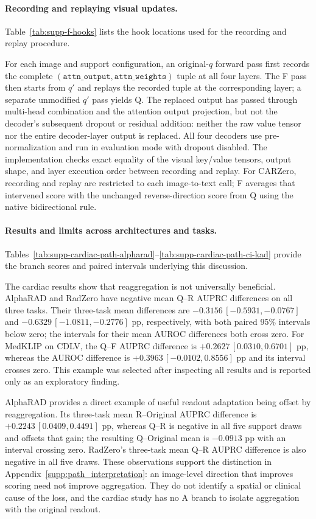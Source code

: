 \paragraph{Recording and replaying visual updates.}
Table~\ref{tab:supp-f-hooks} lists the hook locations used for the recording and replay procedure.

For each image and support configuration, an original-$q$ forward pass first records the complete $(\texttt{attn\_output},\texttt{attn\_weights})$ tuple at all four layers. The F pass then starts from $q'$ and replays the recorded tuple at the corresponding layer; a separate unmodified $q'$ pass yields Q. The replaced output has passed through multi-head combination and the attention output projection, but not the decoder's subsequent dropout or residual addition: neither the raw value tensor nor the entire decoder-layer output is replaced. All four decoders use pre-normalization and run in evaluation mode with dropout disabled. The implementation checks exact equality of the visual key/value tensors, output shape, and layer execution order between recording and replay. For CARZero, recording and replay are restricted to each image-to-text call; F averages that intervened score with the unchanged reverse-direction score from Q using the native bidirectional rule.

\paragraph{Results and limits across architectures and tasks.}
Tables~\ref{tab:supp-cardiac-path-alpharad}--\ref{tab:supp-cardiac-path-ci-kad} provide the branch scores and paired intervals underlying this discussion.

The cardiac results show that reaggregation is not universally beneficial. AlphaRAD and RadZero have negative mean Q--R AUPRC differences on all three tasks. Their three-task mean differences are $-0.3156\,[-0.5931,-0.0767]$ and $-0.6329\,[-1.0811,-0.2776]$ pp, respectively, with both paired 95\% intervals below zero; the intervals for their mean AUROC differences both cross zero. For MedKLIP on CDLV, the Q--F AUPRC difference is $+0.2627\,[0.0310,0.6701]$ pp, whereas the AUROC difference is $+0.3963\,[-0.0102,0.8556]$ pp and its interval crosses zero. This example was selected after inspecting all results and is reported only as an exploratory finding.

AlphaRAD provides a direct example of useful readout adaptation being offset by reaggregation. Its three-task mean R--Original AUPRC difference is $+0.2243\,[0.0409,0.4491]$ pp, whereas Q--R is negative in all five support draws and offsets that gain; the resulting Q--Original mean is $-0.0913$ pp with an interval crossing zero. RadZero's three-task mean Q--R AUPRC difference is also negative in all five draws. These observations support the distinction in Appendix~\ref{supp:path_interpretation}: an image-level direction that improves scoring need not improve aggregation. They do not identify a spatial or clinical cause of the loss, and the cardiac study has no A branch to isolate aggregation with the original readout.

